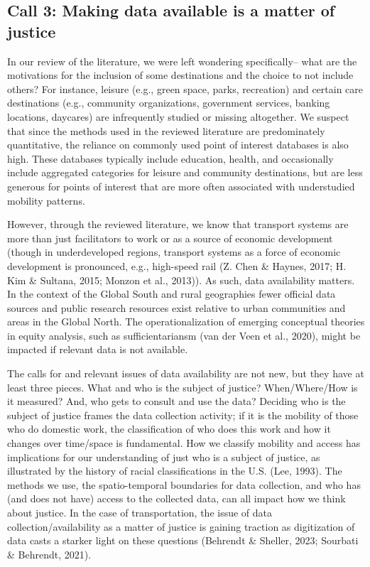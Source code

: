\documentclass[
  letterpaper,
  DIV=11,
  numbers=noendperiod]{scrartcl}
\begin{document}
\subsection{Call 3: Making data available is a matter of
justice}\label{call-3-making-data-available-is-a-matter-of-justice}

In our review of the literature, we were left wondering specifically--
what are the motivations for the inclusion of some destinations and the
choice to not include others? For instance, leisure (e.g., green space,
parks, recreation) and certain care destinations (e.g., community
organizations, government services, banking locations, daycares) are
infrequently studied or missing altogether. We suspect that since the
methods used in the reviewed literature are predominately quantitative,
the reliance on commonly used point of interest databases is also high.
These databases typically include education, health, and occasionally
include aggregated categories for leisure and community destinations,
but are less generous for points of interest that are more often
associated with understudied mobility patterns.

However, through the reviewed literature, we know that transport systems
are more than just facilitators to work or as a source of economic
development (though in underdeveloped regions, transport systems as a
force of economic development is pronounced, e.g., high-speed rail (Z.
Chen \& Haynes, 2017; H. Kim \& Sultana, 2015; Monzon et al., 2013)). As
such, data availability matters. In the context of the Global South and
rural geographies fewer official data sources and public research
resources exist relative to urban communities and areas in the Global
North. The operationalization of emerging conceptual theories in equity
analysis, such as sufficientariansm (van der Veen et al., 2020), might
be impacted if relevant data is not available.

The calls for and relevant issues of data availability are not new, but
they have at least three pieces. What and who is the subject of justice?
When/Where/How is it measured? And, who gets to consult and use the
data? Deciding who is the subject of justice frames the data collection
activity; if it is the mobility of those who do domestic work, the
classification of who does this work and how it changes over time/space
is fundamental. How we classify mobility and access has implications for
our understanding of just who is a subject of justice, as illustrated by
the history of racial classifications in the U.S. (Lee, 1993). The
methods we use, the spatio-temporal boundaries for data collection, and
who has (and does not have) access to the collected data, can all impact
how we think about justice. In the case of transportation, the issue of
data collection/availability as a matter of justice is gaining traction
as digitization of data casts a starker light on these questions
(Behrendt \& Sheller, 2023; Sourbati \& Behrendt, 2021).
\end{document}
